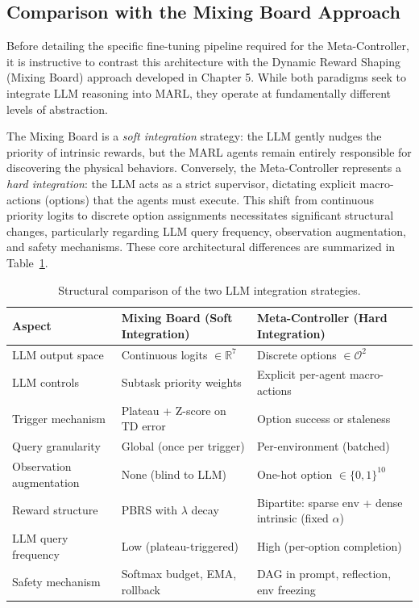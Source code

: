 \subsection{Comparison with the Mixing Board Approach}
\label{sec:hrl_vs_dyn}

Before detailing the specific fine-tuning pipeline required for the Meta-Controller, it is instructive to contrast this architecture with the Dynamic Reward Shaping (Mixing Board) approach developed in Chapter 5. While both paradigms seek to integrate LLM reasoning into MARL, they operate at fundamentally different levels of abstraction. 

The Mixing Board is a \emph{soft integration} strategy: the LLM gently nudges the priority of intrinsic rewards, but the MARL agents remain entirely responsible for discovering the physical behaviors. Conversely, the Meta-Controller represents a \emph{hard integration}: the LLM acts as a strict supervisor, dictating explicit macro-actions (options) that the agents must execute. This shift from continuous priority logits to discrete option assignments necessitates significant structural changes, particularly regarding LLM query frequency, observation augmentation, and safety mechanisms. These core architectural differences are summarized in Table~\ref{tab:approach_comparison}.

\begin{table}[H]
\centering
\caption{Structural comparison of the two LLM integration strategies.}
\label{tab:approach_comparison}
\small
\begin{tabular}{@{}p{3.5cm}p{5cm}p{5cm}@{}}
\toprule
\textbf{Aspect} & \textbf{Mixing Board (Soft Integration)} & \textbf{Meta-Controller (Hard Integration)} \\
\midrule
LLM output space &
    Continuous logits $\in \mathbb{R}^7$ &
    Discrete options $\in \mathcal{O}^2$ \\
LLM controls &
    Subtask priority weights &
    Explicit per-agent macro-actions \\
Trigger mechanism &
    Plateau + Z-score on TD error &
    Option success or staleness \\
Query granularity &
    Global (once per trigger) &
    Per-environment (batched) \\
Observation augmentation &
    None (blind to LLM) &
    One-hot option $\in \{0,1\}^{10}$ \\
Reward structure &
    PBRS with $\lambda$ decay &
    Bipartite: sparse env + dense intrinsic (fixed $\alpha$) \\
LLM query frequency &
    Low (plateau-triggered) &
    High (per-option completion) \\
Safety mechanism &
    Softmax budget, EMA, rollback &
    DAG in prompt, reflection, env freezing \\
\bottomrule
\end{tabular}
\end{table}

